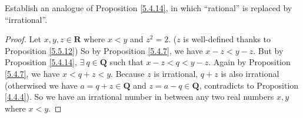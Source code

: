 \begin{exercise}\label{ex 5.5.5}
    Establish an analogue of Proposition \ref{5.4.14}, in which ``rational'' is replaced by ``irrational''.
\end{exercise}

\begin{proof}
    Let \(x, y, z \in \mathbf{R}\) where \(x < y\) and \(z^2 = 2\).
    (\(z\) is well-defined thanks to Proposition \ref{5.5.12})
    So by Proposition \ref{5.4.7}, we have \(x - z < y - z\).
    But by Proposition \ref{5.4.14}, \(\exists\ q \in \mathbf{Q}\) such that \(x - z < q < y - z\).
    Again by Proposition \ref{5.4.7}, we have \(x < q + z < y\).
    Because \(z\) is irrational, \(q + z\) is also irrational
    (otherwised we have \(a = q + z \in \mathbf{Q}\) and \(z = a - q \in \mathbf{Q}\), contradicts to Proposition \ref{4.4.4}).
    So we have an irrational number in between any two real numbers \(x, y\) where \(x < y\).
\end{proof}